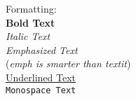 \documentclass{article}
\begin{document}
Formatting:\\
\textbf{Bold Text}\\
\textit{Italic Text}\\
\emph{Emphasized Text}\\
(\textit{emph is \emph{smarter} than textit})\\
\underline{Underlined Text}\\
\texttt{Monospace Text}\\
\end{document}
